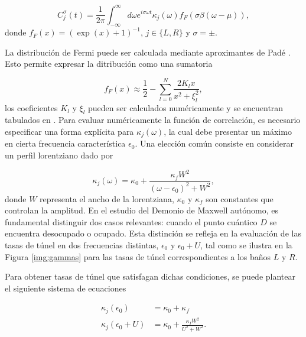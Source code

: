 \begin{appendixs}
\begin{equation*}
    C^{\sigma}_{j}(t) = \frac{1}{2\pi} \int_{-\infty}^{\infty} d\omega e^{i\sigma \omega t} \kappa_{j}(\omega) f_{F}(\sigma \beta(\omega-\mu)),
\end{equation*}
donde $f_{F}(x) = (\exp(x)+1)^{-1}$, \(j\in\{L,R\}\) y $\sigma = \pm$. 

La distribución de Fermi puede ser calculada mediante aproximantes de Padé \cite{hu2011pade,schinabeck2019hierarchical}. Esto permite expresar la ditribución como una sumatoria 

\begin{equation}
    f_{F}(x) \approx \frac{1}{2} - \sum_{l=0}^{N} \frac{ 2 K_{l}x }{ x^{2} + \xi^{2}_{l} },
    \label{apendix5:pade}
\end{equation}
los coeficientes $K_{l}$ y $\xi_{l}$ pueden ser calculados numéricamente y se encuentran tabulados en \cite{hu2011pade}. Para evaluar numéricamente la función de correlación, es necesario especificar una forma explícita para $\kappa_{j}(\omega)$, la cual debe presentar un máximo en cierta frecuencia característica $\epsilon_{0}$. Una elección común consiste en considerar un perfil lorentziano dado por

\begin{equation*}
    \kappa_{j}(\omega) = \kappa_{0} + \frac{\kappa_{f} W^{2}}{(\omega - \epsilon_{0})^{2} + W^{2}},
\end{equation*}
donde $W$ representa el ancho de la lorentziana, $\kappa_{0}$ y $\kappa_{f}$ son constantes que controlan la amplitud. En el estudio del Demonio de Maxwell autónomo, es fundamental distinguir dos casos relevantes: cuando el punto cuántico $D$ se encuentra desocupado o ocupado. Esta distinción se refleja en la evaluación de las tasas de túnel en dos frecuencias distintas, $\epsilon_{0}$ y $\epsilon_{0} + U$, tal como se ilustra en la Figura \ref{img:gammas} para las tasas de túnel correspondientes a los baños $L$ y $R$.


Para obtener tasas de túnel que satisfagan dichas condiciones, se puede plantear el siguiente sistema de ecuaciones 

\begin{align*}
    \kappa_{j}(\epsilon_{0}) & = \kappa_{0} + \kappa_{f} \\
    \kappa_{j}(\epsilon_{0} + U) & = \kappa_{0} + \frac{\kappa_{f} W^{2} }{U^{2} + W^{2}}.
\end{align*}


\end{appendixs}
